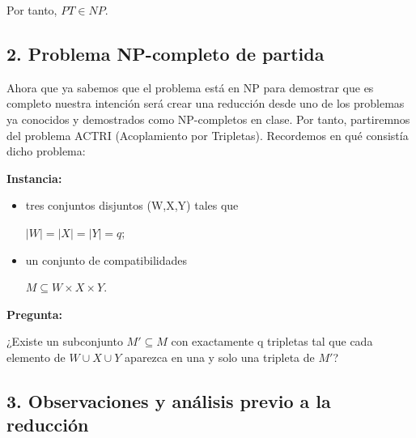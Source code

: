 \documentclass{article}
\begin{document}
Por tanto, $PT \in NP$.


\subsection*{2. Problema NP-completo de partida}

Ahora que ya sabemos que el problema está en NP para demostrar que es completo nuestra intención será crear una reducción desde uno de los problemas ya conocidos y demostrados como NP-completos en clase. Por tanto, partiremnos del problema ACTRI (Acoplamiento por Tripletas). Recordemos en qué consistía dicho problema:

\medskip

\textbf{Instancia:}

\begin{itemize}
\item tres conjuntos disjuntos (W,X,Y) tales que

$|W|=|X|=|Y|=q;$

\item un conjunto de compatibilidades


$M\subseteq W\times X\times Y.$

\end{itemize}

\textbf{Pregunta:}

¿Existe un subconjunto $M'\subseteq M$ con exactamente q tripletas tal que cada elemento de $W\cup X\cup Y$ aparezca en una y solo una tripleta de $M'$?

\medskip

\subsection*{3. Observaciones y análisis previo a la reducción}
\end{document}
